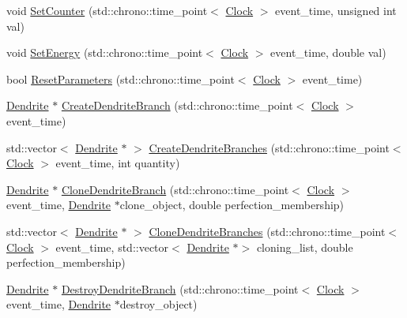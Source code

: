 \begin{DoxyCompactItemize}
\item 
void \hyperlink{class_dendrite_a7529495515de74fff2b9a92b12531057}{Set\+Counter} (std\+::chrono\+::time\+\_\+point$<$ \hyperlink{universe_8h_a0ef8d951d1ca5ab3cfaf7ab4c7a6fd80}{Clock} $>$ event\+\_\+time, unsigned int val)
\item 
void \hyperlink{class_dendrite_ad341dcd42c9d5d486be1e8268d8bca27}{Set\+Energy} (std\+::chrono\+::time\+\_\+point$<$ \hyperlink{universe_8h_a0ef8d951d1ca5ab3cfaf7ab4c7a6fd80}{Clock} $>$ event\+\_\+time, double val)
\item 
bool \hyperlink{class_dendrite_a6a6290955348051819badb801b753901}{Reset\+Parameters} (std\+::chrono\+::time\+\_\+point$<$ \hyperlink{universe_8h_a0ef8d951d1ca5ab3cfaf7ab4c7a6fd80}{Clock} $>$ event\+\_\+time)
\item 
\hyperlink{class_dendrite}{Dendrite} $\ast$ \hyperlink{class_dendrite_ac7b30397a4753f9c37e96ed716e275eb}{Create\+Dendrite\+Branch} (std\+::chrono\+::time\+\_\+point$<$ \hyperlink{universe_8h_a0ef8d951d1ca5ab3cfaf7ab4c7a6fd80}{Clock} $>$ event\+\_\+time)
\item 
std\+::vector$<$ \hyperlink{class_dendrite}{Dendrite} $\ast$ $>$ \hyperlink{class_dendrite_a812b9cd99ae7d81023bfa25c8f563e96}{Create\+Dendrite\+Branches} (std\+::chrono\+::time\+\_\+point$<$ \hyperlink{universe_8h_a0ef8d951d1ca5ab3cfaf7ab4c7a6fd80}{Clock} $>$ event\+\_\+time, int quantity)
\item 
\hyperlink{class_dendrite}{Dendrite} $\ast$ \hyperlink{class_dendrite_ab682ffb9bfd1a1da1623e6b641471068}{Clone\+Dendrite\+Branch} (std\+::chrono\+::time\+\_\+point$<$ \hyperlink{universe_8h_a0ef8d951d1ca5ab3cfaf7ab4c7a6fd80}{Clock} $>$ event\+\_\+time, \hyperlink{class_dendrite}{Dendrite} $\ast$clone\+\_\+object, double perfection\+\_\+membership)
\item 
std\+::vector$<$ \hyperlink{class_dendrite}{Dendrite} $\ast$ $>$ \hyperlink{class_dendrite_abd67c09df69c520e6720bca2592bcc99}{Clone\+Dendrite\+Branches} (std\+::chrono\+::time\+\_\+point$<$ \hyperlink{universe_8h_a0ef8d951d1ca5ab3cfaf7ab4c7a6fd80}{Clock} $>$ event\+\_\+time, std\+::vector$<$ \hyperlink{class_dendrite}{Dendrite} $\ast$$>$ cloning\+\_\+list, double perfection\+\_\+membership)
\item 
\hyperlink{class_dendrite}{Dendrite} $\ast$ \hyperlink{class_dendrite_a87887a43ac38e762255da18eaaee43f5}{Destroy\+Dendrite\+Branch} (std\+::chrono\+::time\+\_\+point$<$ \hyperlink{universe_8h_a0ef8d951d1ca5ab3cfaf7ab4c7a6fd80}{Clock} $>$ event\+\_\+time, \hyperlink{class_dendrite}{Dendrite} $\ast$destroy\+\_\+object)
$$
\end{DoxyCompactItemize}
